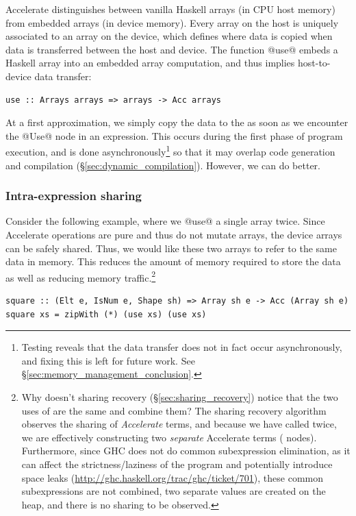 Accelerate distinguishes between vanilla Haskell arrays (in CPU host memory)
from embedded arrays (in \GPU device memory). Every array on the host is
uniquely associated to an array on the device, which defines where data is
copied when data is transferred between the host and device. The function
@use@ embeds a Haskell array into an embedded array computation, and thus
implies host-to-device data transfer:
%
\begin{lstlisting}[style=haskell,numbers=none]
    use :: Arrays arrays => arrays -> Acc arrays
\end{lstlisting}
%

At a first approximation, we simply copy the data to the \GPU as soon as we
encounter the @Use@ node in an expression. This occurs during the first
phase of program execution, and is done asynchronously\footnote{Testing reveals
that the data transfer does not in fact occur asynchronously, and fixing this is
left for future work. See \S\ref{sec:memory_management_conclusion}.}
so that it may overlap code generation and compilation
(\S\ref{sec:dynamic_compilation}). However, we can do better.

\subsubsection{Intra-expression sharing}

Consider the following example, where we @use@ a single array twice. Since
Accelerate operations are pure and thus do not mutate arrays, the device arrays
can be safely shared. Thus, we would like these two arrays to refer to the same
data in \GPU memory. This reduces the amount of memory required to store the
data as well as reducing memory traffic.\footnote{Why doesn't sharing recovery
(\S\ref{sec:sharing_recovery}) notice that the two uses of  are
the same and combine them? The sharing recovery algorithm observes the sharing
of \emph{Accelerate} terms, and because we have called  twice, we
are effectively constructing two \emph{separate} Accelerate terms
( nodes). Furthermore, since GHC does not do common subexpression
elimination, as it can affect the strictness/laziness of the program and
potentially introduce space leaks
(\url{http://ghc.haskell.org/trac/ghc/ticket/701}), these common subexpressions
are not combined, two separate values are created on the heap, and there is no
sharing to be observed.}
%
\begin{lstlisting}[style=haskell]
square :: (Elt e, IsNum e, Shape sh) => Array sh e -> Acc (Array sh e)
square xs = zipWith (*) (use xs) (use xs)
\end{lstlisting}

